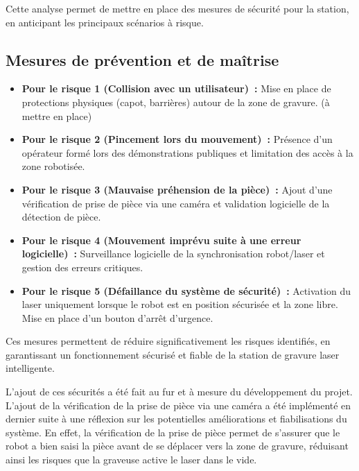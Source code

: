 Cette analyse permet de mettre en place des mesures de sécurité pour la station, en anticipant les principaux scénarios à risque.

\subsection{Mesures de prévention et de maîtrise}
\begin{itemize}
    \item \textbf{Pour le risque 1 (Collision avec un utilisateur)~:} Mise en place de protections physiques (capot, barrières) autour de la zone de gravure. (à mettre en place)
    \item \textbf{Pour le risque 2 (Pincement lors du mouvement)~:} Présence d'un opérateur formé lors des démonstrations publiques et limitation des accès à la zone robotisée.
    \item \textbf{Pour le risque 3 (Mauvaise préhension de la pièce)~:} Ajout d'une vérification de prise de pièce via une caméra et validation logicielle de la détection de pièce.
    \item \textbf{Pour le risque 4 (Mouvement imprévu suite à une erreur logicielle)~:} Surveillance logicielle de la synchronisation robot/laser et gestion des erreurs critiques.
    \item \textbf{Pour le risque 5 (Défaillance du système de sécurité)~:} Activation du laser uniquement lorsque le robot est en position sécurisée et la zone libre. Mise en place d'un bouton d'arrêt d'urgence.
\end{itemize}

Ces mesures permettent de réduire significativement les risques identifiés, en garantissant un fonctionnement sécurisé et fiable de la station de gravure laser intelligente.

L'ajout de ces sécurités a été fait au fur et à mesure du développement du projet. L'ajout de la vérification de la prise de pièce via une caméra a été implémenté en dernier suite à une réflexion sur les potentielles améliorations et fiabilisations du système. En effet, la vérification de la prise de pièce permet de s'assurer que le robot a bien saisi la pièce avant de se déplacer vers la zone de gravure, réduisant ainsi les risques que la graveuse active le laser dans le vide.
